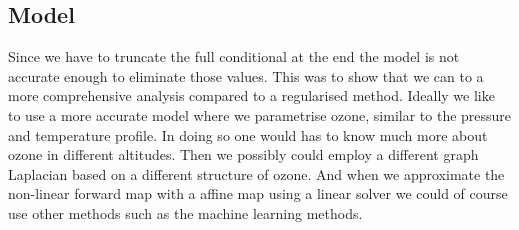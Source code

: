 \subsection{Model}
Since we have to truncate the full conditional at the end the model is not accurate enough to eliminate those values.
This was to show that we can to a more comprehensive analysis compared to a regularised method.
Ideally we like to use a more accurate model where we parametrise ozone, similar to the pressure and temperature profile.
In doing so one would has to know much more about ozone in different altitudes.
Then we possibly could employ a different graph Laplacian based on a different structure of ozone.
And when we approximate the non-linear forward map with a affine map using a linear solver we could of course use other methods such as the machine learning methods.

